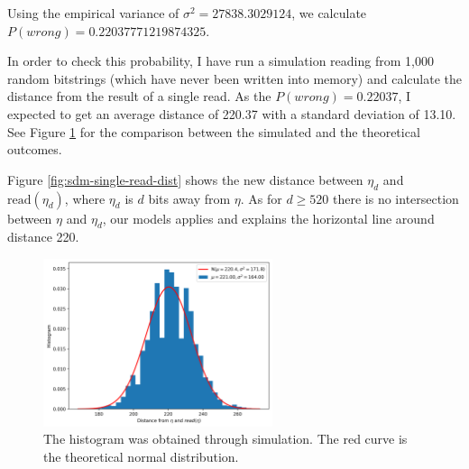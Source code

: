 \documentclass[12pt]{article}
\begin{document}
Using the empirical variance of $\sigma^2 = 27838.3029124$, we calculate $P(wrong) = 0.22037771219874325$.

In order to check this probability, I have run a simulation reading from 1,000 random bitstrings (which have never been written into memory) and calculate the distance from the result of a single read. As the $P(wrong) = 0.22037$, I expected to get an average distance of 220.37 with a standard deviation of 13.10. See Figure \ref{fig:sdm-read-random-bs} for the comparison between the simulated and the theoretical outcomes.

Figure \ref{fig:sdm-single-read-dist} shows the new distance between $\eta_d$ and $\text{read}(\eta_d)$, where $\eta_d$ is $d$ bits away from $\eta$. As for $d \ge 520$ there is no intersection between $\eta$ and $\eta_d$, our models applies and explains the horizontal line around distance 220.

\begin{figure}[!htb]
  \centering
  \includegraphics[width=0.6\textwidth]{./images02/autocorrelation/read-random-bs.png}

  \caption{The histogram was obtained through simulation. The red curve is the theoretical normal distribution.}
  \label{fig:sdm-read-random-bs}
\end{figure}
\end{document}
